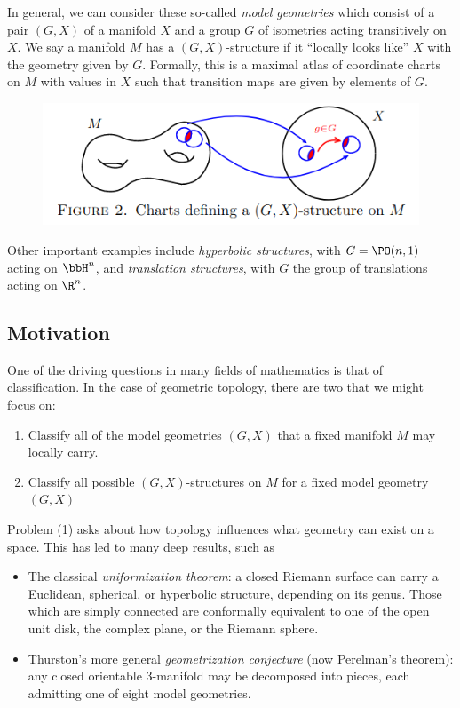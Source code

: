 \documentclass{article}
\begin{document}
\begin{example}
	In general, we can consider these so-called \textit{model geometries} which consist of a pair $(G,X)$ of a manifold $X$ and a group $G$ of isometries acting transitively on $X$. We say a manifold $M$ has a $(G,X)$-structure if it ``locally looks like'' $X$ with the geometry given by $G$. Formally, this is a maximal atlas of coordinate charts on $M$ with values in $X$ such that transition maps are given by elements of $G$.
	\begin{figure}[H]
		\centering
		\includegraphics[scale=0.5]{GX-Charts.png}
	\end{figure}
	Other important examples include \textit{hyperbolic structures}, with $G = \PO(n,1)$ acting on $\bbH^n$, and \textit{translation structures}, with $G$ the group of translations acting on $\R^n$.
\end{example}

\subsection{Motivation}
One of the driving questions in many fields of mathematics is that of classification. In the case of geometric topology, there are two that we might focus on:
\begin{enumerate}
	\item Classify all of the model geometries $(G,X)$ that a fixed manifold $M$ may locally carry.
	\item Classify all possible $(G,X)$-structures on $M$ for a fixed model geometry $(G,X)$
\end{enumerate}
Problem (1) asks about how topology influences what geometry can exist on a space. This has led to many deep results, such as
\begin{itemize}
	\item The classical \textit{uniformization theorem}: a closed Riemann surface can carry a Euclidean, spherical, or hyperbolic structure, depending on its genus. Those which are simply connected are conformally equivalent to one of the open unit disk, the complex plane, or the Riemann sphere.
	\item Thurston's more general \textit{geometrization conjecture} (now Perelman's theorem): any closed orientable 3-manifold may be decomposed into pieces, each admitting one of eight model geometries. 
\end{itemize}
\end{document}
